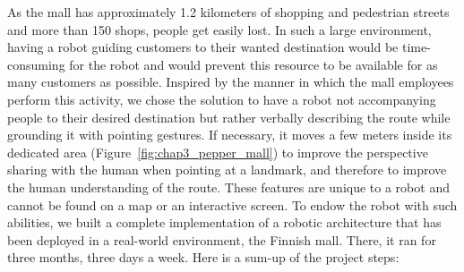 \documentclass[a4paper,11pt,twoside]{StyleThese}
\begin{document}
As the mall has approximately 1.2 kilometers of shopping and pedestrian streets and more than 150 shops, people get easily lost. In such a large environment, having a robot guiding customers to their wanted destination would be time-consuming for the robot and would prevent this resource to be available for as many customers as possible. Inspired by the manner in which the mall employees perform this activity, we chose the solution to have a robot not accompanying people to their desired destination but rather verbally describing the route while grounding it with pointing gestures. If necessary, it moves a few meters inside its dedicated area (Figure~\ref{fig:chap3_pepper_mall}) to improve the perspective sharing with the human when pointing at a landmark, and therefore to improve the human understanding of the route. These features are unique to a robot and cannot be found on a map or an interactive screen. To endow the robot with such abilities, we built a complete implementation of a robotic architecture that has been deployed in a real-world environment, the Finnish mall. There, it ran for three months, three days a week. Here is a sum-up of the project steps:
\end{document}
